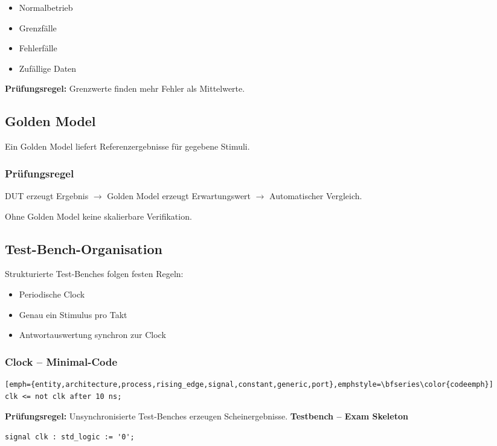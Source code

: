 \documentclass[10pt,a4paper]{article}
\newcommand{\hilite}[1]{\colorbox{yellow!25}{#1}}
\newcommand{\imp}[1]{\textbf{\textcolor{codeemph}{#1}}}
\begin{document}
\begin{multicols}{3}
\begin{itemize}
  \item Normalbetrieb
  \item Grenzfälle
  \item Fehlerfälle
  \item Zufällige Daten
\end{itemize}

\imp{Prüfungsregel:}  
\hilite{Grenzwerte} \hilite{finden} \hilite{mehr} Fehler als Mittelwerte.

\subsection{Golden Model}
Ein Golden Model liefert Referenzergebnisse für gegebene Stimuli.

\subsubsection*{\textcolor{codeemph}{Prüfungsregel}}
DUT erzeugt Ergebnis $\rightarrow$ Golden Model erzeugt Erwartungswert $\rightarrow$ Automatischer Vergleich.


Ohne Golden Model keine skalierbare Verifikation.

\subsection{Test-Bench-Organisation}
Strukturierte Test-Benches folgen festen Regeln:

\begin{itemize}
  \item Periodische Clock
  \item Genau ein Stimulus pro Takt
  \item Antwortauswertung synchron zur Clock
\end{itemize}

\subsubsection*{Clock – Minimal-Code}
\begin{lstlisting}[emph={entity,architecture,process,rising_edge,signal,constant,generic,port},emphstyle=\bfseries\color{codeemph}][emph={entity,architecture,process,rising_edge,signal,constant,generic,port},emphstyle=\bfseries\color{codeemph}]
clk <= not clk after 10 ns;
\end{lstlisting}

\imp{Prüfungsregel:}  
Un\hilite{synchron}\hilite{isierte} \hilite{Test-Benches} erzeugen Scheinergebnisse.
\textbf{Testbench – Exam Skeleton}
\begin{lstlisting}
signal clk : std_logic := '0';


\end{lstlisting}
\end{multicols}
\end{document}
